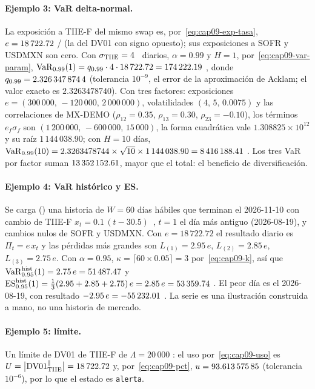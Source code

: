 \paragraph{Ejemplo 3: VaR delta-normal.} La exposición a TIIE-F del mismo swap es, por~\eqref{eq:cap09-exp-tasa}, $e=\verif{cap09-var-exposicion-tiie}{18722.72}$ \MXN/\pb{} (la del DV01 con signo opuesto); sus exposiciones a SOFR y USDMXN son cero. Con $\sigma_{\cTIIE}=4$~\pb{} diarios, $\alpha=0.99$ y $H=1$, por~\eqref{eq:cap09-var-param}, $\VaR{0.99}(1)=q_{0.99}\cdot4\cdot18\,722.72=\verif{cap09-var-irs}{174222.19}$ \MXN, donde $q_{0.99}=\verif{cap09-z-99}{2.3263478744}$ (tolerancia $10^{-9}$, el error de la aproximación de Acklam; el valor exacto es $2.3263478740$). Con tres factores: exposiciones $e=(300\,000,\,-120\,000,\,2\,000\,000)$, volatilidades $(4,\,5,\,0.0075)$ y las correlaciones de MX-DEMO ($\rho_{12}=0.35$, $\rho_{13}=0.30$, $\rho_{23}=-0.10$), los términos $e_f\sigma_f$ son $(1\,200\,000,\,-600\,000,\,15\,000)$, la forma cuadrática vale $1.308825\times10^{12}$ y su raíz $1\,144\,038.90$; con $H=10$ días, $\VaR{0.99}(10)=2.3263478744\times\sqrt{10}\times1\,144\,038.90=\verif{cap09-var-vector}{8416188.41}$ \MXN. Los tres VaR por factor suman $\verif{cap09-var-suma-factores}{13352152.61}$, mayor que el total: el beneficio de diversificación.

\paragraph{Ejemplo 4: VaR histórico y ES.} Se carga () una historia de $W=60$ días hábiles que terminan el 2026-11-10 con cambio de TIIE-F $x_t=0.1\,(t-30.5)$~\pb, $t=1$ el día más antiguo (2026-08-19), y cambios nulos de SOFR y USDMXN. Con $e=18\,722.72$ el resultado diario es $\Pi_t=e\,x_t$ y las pérdidas más grandes son $L_{(1)}=2.95\,e$, $L_{(2)}=2.85\,e$, $L_{(3)}=2.75\,e$. Con $\alpha=0.95$, $\kappa=\lceil60\times0.05\rceil=3$ por~\eqref{eq:cap09-k}, así que $\VaR{0.95}^{\mathrm{hist}}(1)=2.75\,e=\verif{cap09-var-historico}{51487.47}$ y $\ES{0.95}^{\mathrm{hist}}(1)=\tfrac13(2.95+2.85+2.75)\,e=2.85\,e=\verif{cap09-es-historico}{53359.74}$ \MXN. El peor día es el 2026-08-19, con resultado $-2.95\,e=\verif{cap09-peor-dia}{-55232.01}$ \MXN. La serie es una ilustración construida a mano, no una historia de mercado.

\paragraph{Ejemplo 5: límite.} Un límite de DV01 de TIIE-F de $\Lambda=20\,000$ \MXN: el uso por~\eqref{eq:cap09-uso} es $U=\bigl|\DVO^{\parallel}_{\cTIIE}\bigr|=\verif{cap09-limite-uso}{18722.72}$ y, por~\eqref{eq:cap09-pct}, $u=\verif{cap09-limite-pct}{93.61357585}$ (tolerancia $10^{-6}$), por lo que el estado es \texttt{alerta}.

